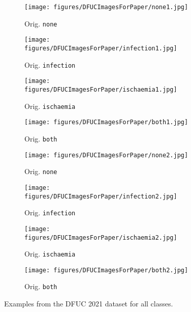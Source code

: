 \documentclass[runningheads]{llncs}
\begin{document}
\begin{figure}[ht!]
    \centering
    \begin{subfigure}[b]{0.24\textwidth}
        \centering
        \texttt{[image: figures/DFUCImagesForPaper/none1.jpg]}
        \caption{Orig. \texttt{none}}
        \label{fig:DatasetImage_none}
    \end{subfigure}
    \hfill
    \begin{subfigure}[b]{0.24\textwidth}
        \centering
        \texttt{[image: figures/DFUCImagesForPaper/infection1.jpg]}
        \caption{Orig. \texttt{infection}}
        \label{fig:DatasetImage_infection}
    \end{subfigure}
    \hfill
    \begin{subfigure}[b]{0.24\textwidth}
        \centering
        \texttt{[image: figures/DFUCImagesForPaper/ischaemia1.jpg]}
        \caption{Orig. \texttt{ischaemia}}
        \label{fig:DatasetImage_Ischaemia}
    \end{subfigure}
    \hfill
    \begin{subfigure}[b]{0.24\textwidth}
        \centering
        \texttt{[image: figures/DFUCImagesForPaper/both1.jpg]}
        \caption{Orig. \texttt{both}}
        \label{fig:DatasetImage_both}
    \end{subfigure}
    \begin{subfigure}[b]{0.24\textwidth}
        \centering
        \texttt{[image: figures/DFUCImagesForPaper/none2.jpg]}
        \caption{Orig. \texttt{none}}
        \label{fig:DatasetImage_none2}
    \end{subfigure}
    \hfill
    \begin{subfigure}[b]{0.24\textwidth}
        \centering
        \texttt{[image: figures/DFUCImagesForPaper/infection2.jpg]}
        \caption{Orig. \texttt{infection}}
        \label{fig:DatasetImage_Infection2}
    \end{subfigure}
    \hfill
    \begin{subfigure}[b]{0.24\textwidth}
        \centering
        \texttt{[image: figures/DFUCImagesForPaper/ischaemia2.jpg]}
        \caption{Orig. \texttt{ischaemia}}
        \label{fig:DatasetImage_Ischaemia2}
    \end{subfigure}
    \hfill
    \begin{subfigure}[b]{0.24\textwidth}
        \centering
        \texttt{[image: figures/DFUCImagesForPaper/both2.jpg]}
        \caption{Orig. \texttt{both}}
        \label{fig:DatasetImage_both2}
    \end{subfigure}
    \caption{Examples from the DFUC 2021 dataset for all classes.}
    \label{fig:DFUOrigImages}
\end{figure}
\end{document}
